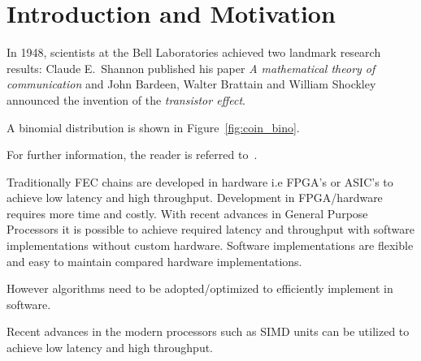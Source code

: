 \chapter{Introduction and Motivation} \label{chap:introduction}

In 1948, scientists at the Bell Laboratories achieved two landmark research results:
Claude E.~Shannon published his paper \emph{A mathematical theory of communication} and John Bardeen, Walter Brattain and William Shockley announced the invention of the \emph{transistor effect}.

\cite{Arikan}

A binomial distribution is shown in Figure~\ref{fig:coin_bino}.


For further information, the reader is referred to~\cite{Cover}.\newline

Traditionally FEC chains are developed in hardware i.e FPGA’s or ASIC’s to achieve low latency and high throughput.
Development in FPGA/hardware requires more time and costly.
With recent advances in General Purpose Processors it is possible to achieve required latency and throughput with software implementations without custom hardware.
Software implementations are flexible and easy to maintain compared hardware implementations.

However algorithms need to be adopted/optimized to efficiently implement in software.

Recent advances in the modern processors such as SIMD units can be utilized to achieve low latency and high throughput.

\cite{PolarCodesPrimaryConcepts}

\cite{DesignOfPolarCodes5G}

\cite{fastSSC}

\cite{multiGbpsSoftwareDec}

\cite{SCL}

\clearpage
